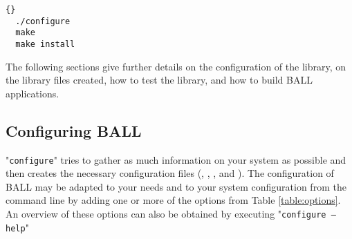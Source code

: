 \begin{lstlisting}{}
  ./configure
  make
  make install
\end{lstlisting}

The following sections give further details on the configuration of the 
library, on the library files created, how to test the library, and how to 
build BALL applications.

\subsection{Configuring BALL}

"{\tt configure}" tries to gather as much information on your system as 
possible and then creates the necessary configuration files (,
, , and ).
The configuration of BALL may be adapted to your needs and to your system
configuration from the command line by adding one or more of the options from
Table \ref{table:options}.
An overview of these options can also be obtained by executing "{\tt configure
--help}"

